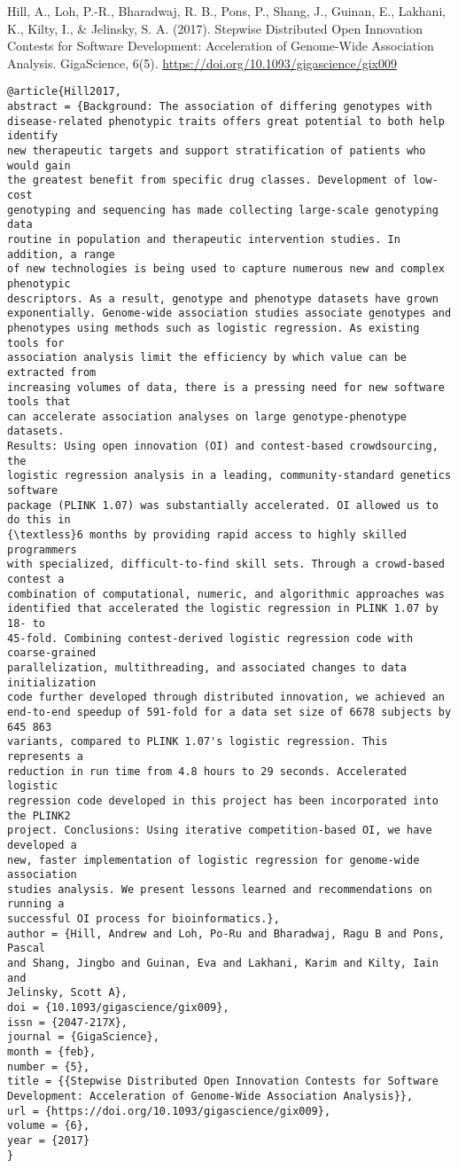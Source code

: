 \documentclass[]{article}
\begin{document}
Hill, A., Loh, P.-R., Bharadwaj, R. B., Pons, P., Shang, J., Guinan, E., Lakhani, K., Kilty, I., \& Jelinsky, S. A. (2017). Stepwise Distributed Open Innovation Contests for Software Development: Acceleration of Genome-Wide Association Analysis. GigaScience, 6(5). \url{https://doi.org/10.1093/gigascience/gix009}

\begin{verbatim}
@article{Hill2017,
abstract = {Background: The association of differing genotypes with
disease-related phenotypic traits offers great potential to both help identify
new therapeutic targets and support stratification of patients who would gain
the greatest benefit from specific drug classes. Development of low-cost
genotyping and sequencing has made collecting large-scale genotyping data
routine in population and therapeutic intervention studies. In addition, a range
of new technologies is being used to capture numerous new and complex phenotypic
descriptors. As a result, genotype and phenotype datasets have grown
exponentially. Genome-wide association studies associate genotypes and
phenotypes using methods such as logistic regression. As existing tools for
association analysis limit the efficiency by which value can be extracted from
increasing volumes of data, there is a pressing need for new software tools that
can accelerate association analyses on large genotype-phenotype datasets.
Results: Using open innovation (OI) and contest-based crowdsourcing, the
logistic regression analysis in a leading, community-standard genetics software
package (PLINK 1.07) was substantially accelerated. OI allowed us to do this in
{\textless}6 months by providing rapid access to highly skilled programmers
with specialized, difficult-to-find skill sets. Through a crowd-based contest a
combination of computational, numeric, and algorithmic approaches was
identified that accelerated the logistic regression in PLINK 1.07 by 18- to
45-fold. Combining contest-derived logistic regression code with coarse-grained
parallelization, multithreading, and associated changes to data initialization
code further developed through distributed innovation, we achieved an
end-to-end speedup of 591-fold for a data set size of 6678 subjects by 645 863
variants, compared to PLINK 1.07's logistic regression. This represents a
reduction in run time from 4.8 hours to 29 seconds. Accelerated logistic
regression code developed in this project has been incorporated into the PLINK2
project. Conclusions: Using iterative competition-based OI, we have developed a
new, faster implementation of logistic regression for genome-wide association
studies analysis. We present lessons learned and recommendations on running a
successful OI process for bioinformatics.},
author = {Hill, Andrew and Loh, Po-Ru and Bharadwaj, Ragu B and Pons, Pascal
and Shang, Jingbo and Guinan, Eva and Lakhani, Karim and Kilty, Iain and
Jelinsky, Scott A},
doi = {10.1093/gigascience/gix009},
issn = {2047-217X},
journal = {GigaScience},
month = {feb},
number = {5},
title = {{Stepwise Distributed Open Innovation Contests for Software
Development: Acceleration of Genome-Wide Association Analysis}},
url = {https://doi.org/10.1093/gigascience/gix009},
volume = {6},
year = {2017}
}
\end{verbatim}
\end{document}
